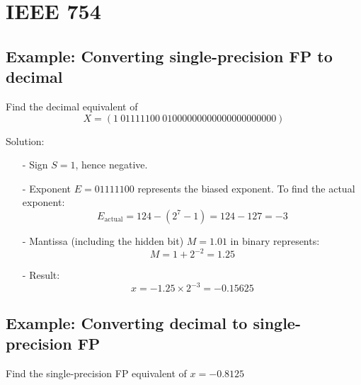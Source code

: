 \documentclass[12pt,openany, tikz,border=10pt]{book}
\begin{document}
			      	\section*{IEEE 754}
			      	\subsection*{Example: Converting single-precision FP to decimal}
			      	
			      	Find the decimal equivalent of
			      	\[ X = (1\ 01111100\ 01000000000000000000000) \]
			      	
			      	Solution:
			      	\begin{itemize}
			      		\item[-] Sign \( S = 1 \), hence negative.
			      		\item[-] Exponent \( E = 01111100 \) represents the biased exponent. To find the actual exponent:
			      		      \[ E_{\text{actual}} = 124 - (2^7 - 1) = 124 - 127 = -3 \]
			      		\item[-] Mantissa (including the hidden bit) \( M = 1.01 \) in binary represents:
			      		      \[ M = 1 + 2^{-2} = 1.25 \]
			      		\item[-] Result:
			      		      \[ x = -1.25 \times 2^{-3} = -0.15625 \]
			      	\end{itemize}
			      	
			      	\subsection*{Example: Converting decimal to single-precision FP}
			      	
			      	Find the single-precision FP equivalent of \( x = -0.8125 \)
			      	
\end{document}
